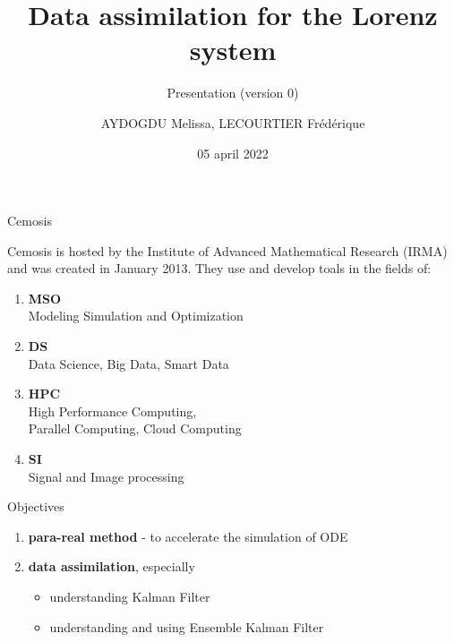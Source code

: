 \documentclass[10pt,xcolor={table,dvipsnames},t]{beamer}
\title[Your Short Title]{Data assimilation for the Lorenz system}
\subtitle{Presentation (version 0)}
\author[name]{AYDOGDU Melissa, LECOURTIER Frédérique}
\institute{\large Strasbourg University}
\date{05 april 2022}
\begin{document}
	
	\begin{frame}
		\titlepage
	\end{frame}
	
	\AtBeginSection[]{
		\begin{frame}
			\vfill
			\centering
			\begin{beamercolorbox}[sep=5pt,shadow=true,rounded=true]{subtitle}
				\usebeamerfont{title}\insertsectionhead\par%
			\end{beamercolorbox}
			\vfill
		\end{frame}
	}



	\begin{frame}{Cemosis}
		
		\begin{minipage}{0.4\hsize}
		\end{minipage} \quad
		\begin{minipage}{0.5\hsize}
		Cemosis is hosted by the Institute of Advanced Mathematical Research (IRMA) and was created in January 2013. They use and develop toals in the fields of: 
			\begin{enumerate}[\textbullet]
				\item \textbf{MSO} \\
				Modeling Simulation and Optimization
				\item \textbf{DS} \\
				Data Science, Big Data, Smart Data
				\item \textbf{HPC} \\
				High Performance Computing, \\
				Parallel Computing, Cloud Computing
				\item \textbf{SI} \\
				Signal and Image processing
			\end{enumerate}
		\end{minipage}
	\end{frame}

	\begin{frame}{Objectives}
		
		 \begin{enumerate}[\textbullet]
			\item \textbf{para-real method} - \quad to accelerate the simulation of ODE
			\item \textbf{data assimilation}, especially
			\begin{itemize}
				\item understanding Kalman Filter
				\item understanding and using Ensemble Kalman Filter
			\end{itemize}
		\end{enumerate}	 	
		
	\end{frame}
	
\end{document}
